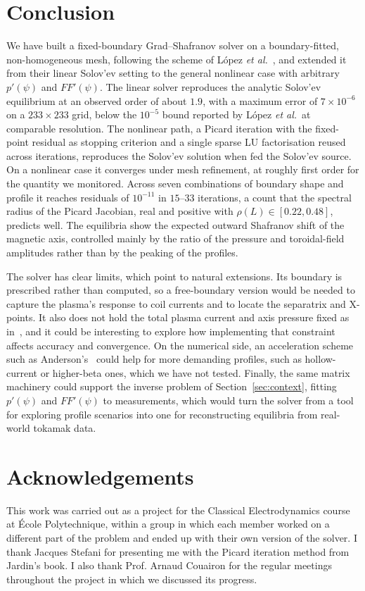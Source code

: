 \documentclass[11pt,a4paper]{article}
\begin{document}
\section{Conclusion}\label{sec:conclusion}
We have built a fixed-boundary Grad--Shafranov solver on a boundary-fitted, non-homogeneous mesh, following the scheme of L\'opez \emph{et al.}~\cite{lopez2019}, and extended it from their linear Solov'ev setting to the general nonlinear case with arbitrary $p'(\psi)$ and $FF'(\psi)$. The linear solver reproduces the analytic Solov'ev equilibrium at an observed order of about $1.9$, with a maximum error of $7\times10^{-6}$ on a $233\times233$ grid, below the $10^{-5}$ bound reported by L\'opez \emph{et al.}\ at comparable resolution. The nonlinear path, a Picard iteration with the fixed-point residual as stopping criterion and a single sparse LU factorisation reused across iterations, reproduces the Solov'ev solution when fed the Solov'ev source. On a nonlinear case it converges under mesh refinement, at roughly first order for the quantity we monitored. Across seven combinations of boundary shape and profile it reaches residuals of $10^{-11}$ in $15$--$33$ iterations, a count that the spectral radius of the Picard Jacobian, real and positive with $\rho(L)\in[0.22,0.48]$, predicts well. The equilibria show the expected outward Shafranov shift of the magnetic axis, controlled mainly by the ratio of the pressure and toroidal-field amplitudes rather than by the peaking of the profiles.

The solver has clear limits, which point to natural extensions. Its boundary is prescribed rather than computed, so a free-boundary version would be needed to capture the plasma's response to coil currents and to locate the separatrix and X-points. It also does not hold the total plasma current and axis pressure fixed as in~\cite{lopez2019}, and it could be interesting to explore how implementing that constraint affects accuracy and convergence. On the numerical side, an acceleration scheme such as Anderson's~\cite{anderson1965} could help for more demanding profiles, such as hollow-current or higher-beta ones, which we have not tested. Finally, the same matrix machinery could support the inverse problem of Section~\ref{sec:context}, fitting $p'(\psi)$ and $FF'(\psi)$ to measurements, which would turn the solver from a tool for exploring profile scenarios into one for reconstructing equilibria from real-world tokamak data.
\section*{Acknowledgements}
This work was carried out as a project for the Classical Electrodynamics course at \'Ecole Polytechnique, within a group in which each member worked on a different part of the problem and ended up with their own version of the solver. I thank Jacques Stefani for presenting me with the Picard iteration method from Jardin's book. I also thank Prof. Arnaud Couairon for the regular meetings throughout the project in which we discussed its progress.
\end{document}
